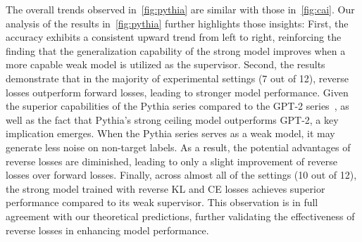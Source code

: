 The overall trends observed in~\cref{fig:pythia} are similar with those in~\cref{fig:cai}. Our analysis of the results in~\cref{fig:pythia} further highlights those insights:
First, the accuracy exhibits a consistent upward trend from left to right, reinforcing the finding that the generalization capability of the strong model improves when a more capable weak model is utilized as the supervisor.
Second, the results demonstrate that in the majority of experimental settings (7 out of 12), reverse losses outperform forward losses, leading to stronger model performance.
Given the superior capabilities of the Pythia series compared to the GPT-2 series~\citep{biderman2023pythia}, as well as the fact that Pythia's strong ceiling model outperforms GPT-2, a key implication emerges. When the Pythia series serves as a weak model, it may generate less noise on non-target labels. As a result, the potential advantages of reverse losses are diminished, leading to only a slight improvement of reverse losses over forward losses.
Finally, across almost all of the settings (10 out of 12), the strong model trained with reverse KL and CE losses achieves superior performance compared to its weak supervisor. This observation is in full agreement with our theoretical predictions, further validating the effectiveness of reverse losses in enhancing model performance.









\begin{figure*}[t]
\begin{center}
\vspace{-10pt}
\caption{Results of Pythia-series. ``SC'' denotes the strong ceiling model, and ``A to B'' indicates the use of weak teacher ``A'' to supervise strong student ``B''. The terms CE, RCE, KL, and RKL refer to cross-entropy loss, reverse cross-entropy loss, forward KL divergence loss, and reverse KL divergence loss, respectively. Error bars represent the standard deviation across three runs of the experiment.}
\label{fig:pythia}
\end{center}
\vspace{-10pt}
\end{figure*}


